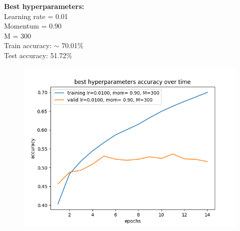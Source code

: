 \documentclass{article}
\newcommand{\1}{\mathbf{1}}
\begin{document}
{\begin{figure}[h]
  \centering
\end{figure}

\newpage 

\textbf{Best hyperparameters:} \\
Learning rate = 0.01 \\
Momentum = 0.90 \\
M = 300 \\
Train accuracy: $\sim$ 70.01\%\\
Test accuracy: 51.72\%

\begin{figure}[h]
  \centering
  \includegraphics[width=130mm]{../hw3-code/results/a6b/a6_b_best.png}
\end{figure}

}
\end{document}
